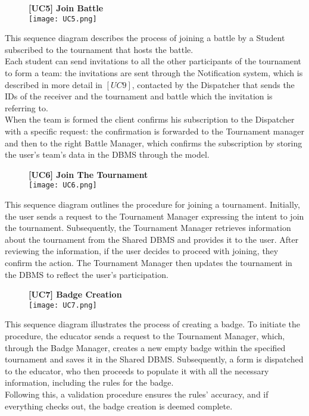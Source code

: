 \documentclass{article}
\begin{document}
\begin{figure}[H]
    \centering
    \textbf{[UC5] Join Battle} \\
    \texttt{[image: UC5.png]}
\end{figure}
\noindent
This sequence diagram describes the process of joining a battle by a Student subscribed to the tournament that hosts the battle.\\
Each student can send invitations to all the other participants of the tournament to form a team: the invitations are sent through the Notification system, which is described in more detail in $[UC9]$, contacted by the Dispatcher that sends the IDs of the receiver and the tournament and battle which the invitation is referring to.\\
When the team is formed the client confirms his subscription to the Dispatcher with a specific request: the confirmation is forwarded to the Tournament manager and then to the right Battle Manager, which confirms the subscription by storing the user's team's data in the DBMS through the model.

\begin{figure}[H]
    \centering
    \textbf{[UC6] Join The Tournament} \\
    \texttt{[image: UC6.png]}
\end{figure}
\noindent
This sequence diagram outlines the procedure for joining a tournament. Initially, the user sends a request to the Tournament Manager expressing the intent to join the tournament. Subsequently, the Tournament Manager retrieves information about the tournament from the Shared DBMS and provides it to the user. After reviewing the information, if the user decides to proceed with joining, they confirm the action. The Tournament Manager then updates the tournament in the DBMS to reflect the user's participation.

\begin{figure}[H]
    \centering
    \textbf{[UC7] Badge Creation} \\
    \texttt{[image: UC7.png]}
\end{figure}
\noindent
This sequence diagram illustrates the process of creating a badge. To initiate the procedure, the educator sends a request to the Tournament Manager, which, through the Badge Manager, creates a new empty badge within the specified tournament and saves it in the Shared DBMS. Subsequently, a form is dispatched to the educator, who then proceeds to populate it with all the necessary information, including the rules for the badge. \\
Following this, a validation procedure ensures the rules' accuracy, and if everything checks out, the badge creation is deemed complete.
\end{document}
